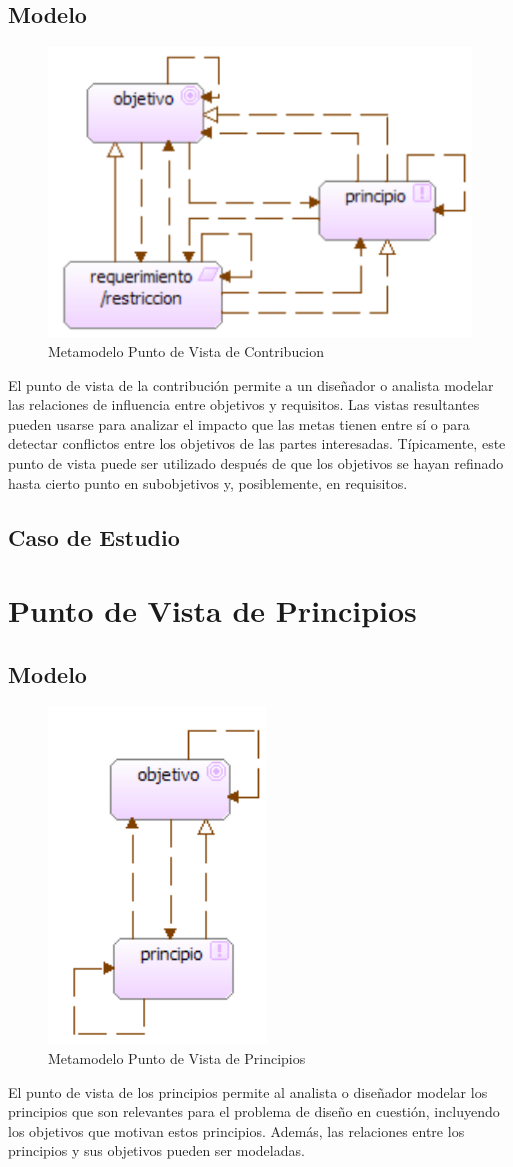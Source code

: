 \subsection{Modelo}
\begin{figure}[th!]
	\centering
	\includegraphics[width=0.4\linewidth]{arquitectura/imagenes/modeloContribucion}
	\caption{Metamodelo Punto de Vista de Contribucion}
	\label{metamodelo contribucion}
\end{figure}
El punto de vista de la contribución permite a un diseñador o analista modelar las relaciones de influencia entre objetivos y requisitos. Las vistas resultantes pueden usarse para analizar el impacto que las metas tienen entre sí o para detectar conflictos entre los objetivos de las partes interesadas.
Típicamente, este punto de vista puede ser utilizado después de que los objetivos se hayan refinado hasta cierto punto en subobjetivos y, posiblemente, en requisitos.

\subsection{Caso de Estudio}

\newpage

\section{Punto de Vista de Principios}

\subsection{Modelo}

\begin{figure}[th!]
	\centering
	\includegraphics[width=0.3\linewidth]{arquitectura/imagenes/modeloPrincipios}
	\caption{Metamodelo Punto de Vista de Principios}
	\label{metamodelo principios}
\end{figure}
El punto de vista de los principios permite al analista o diseñador modelar los principios que son relevantes para el problema de diseño en cuestión, incluyendo los objetivos que motivan estos principios. Además, las relaciones entre los principios y sus objetivos pueden ser modeladas. 

